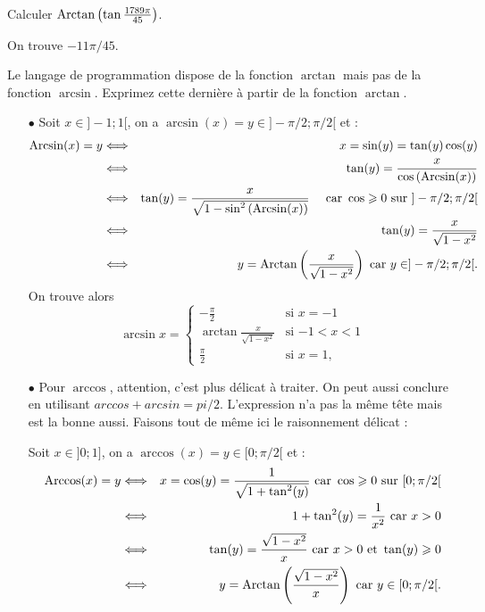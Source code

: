 \documentclass{magnoliaold}
\begin{document}
\begin{exos}
\exemple Calculer $\operatorname{Arctan}\left(\tan\frac{1789\pi}{45}\right)$.
  \begin{sol}
  On trouve $-11\pi/45$.
  \end{sol}
\exemple Le langage de programmation  dispose de la fonction
  $\arctan$ mais pas de la fonction $\arcsin$. Exprimez cette
  dernière à partir de la fonction $\arctan$.
  \begin{sol}
  \begin{itemize}
  \item[$\bullet$]
  Soit $x\in ]-1;1[$, on a $\arcsin(x)=y \in ]-\pi/2;\pi/2[$ et :
  \begin{eqnarray*}
  \operatorname{Arcsin}(x)=y &\Longleftrightarrow & x=\sin(y)=\tan(y)\cos(y) \\
&\Longleftrightarrow & \tan(y)=\dfrac{x}{\cos\left(\operatorname{Arcsin}(x)\right)}\\
&\Longleftrightarrow & \tan(y)=\dfrac{x}{\sqrt{1-\sin^2\left(\operatorname{Arcsin}(x)\right)}} \quad \text{ car } \cos\geqslant 0 \text{ sur } ]-\pi/2;\pi/2[\\
&\Longleftrightarrow & \tan(y)=\frac{x}{\sqrt{1-x^2}}\\
&\Longleftrightarrow & y=\operatorname{Arctan}\left(\frac{x}{\sqrt{1-x^2}}\right) \text{ car } y\in ]-\pi/2;\pi/2[.
  \end{eqnarray*}
  On trouve alors
  \[\arcsin x=
    \begin{cases}
    -\frac{\pi}{2} & \text{si $x=-1$}\\
    \arctan\frac{x}{\sqrt{1-x^2}} & \text{si $-1<x<1$}\\
    \frac{\pi}{2} & \text{si $x=1$,}
    \end{cases}\]
    
    \item[$\bullet$]
    Pour $\arccos$, attention, c'est plus délicat à traiter. On peut aussi conclure en utilisant $arccos+arcsin=pi/2$. L'expression n'a pas la même tête mais est la bonne aussi.
    Faisons tout de même ici le raisonnement délicat :
    
    Soit $x\in ]0;1]$, on a $\arccos(x)=y \in [0;\pi/2[$ et :
  \begin{eqnarray*}
  \operatorname{Arccos}(x)=y &\Longleftrightarrow & x=\cos(y)=\dfrac{1}{\sqrt{1+\tan^2(y)}} \text{ car } \cos\geqslant 0 \text{ sur } [0;\pi/2[\\
&\Longleftrightarrow & 1+\tan^2(y)=\dfrac{1}{x^2} \text{ car } x>0\\
&\Longleftrightarrow & \tan(y)=\frac{\sqrt{1-x^2}}{x} \text{ car } x>0 \text{ et } \tan(y)\geqslant 0\\
&\Longleftrightarrow & y=\operatorname{Arctan}\left(\frac{\sqrt{1-x^2}}{x}\right) \text{ car } y\in [0;\pi/2[.
  \end{eqnarray*}
  

\end{itemize}
\end{sol}
\end{exos}
\end{document}
